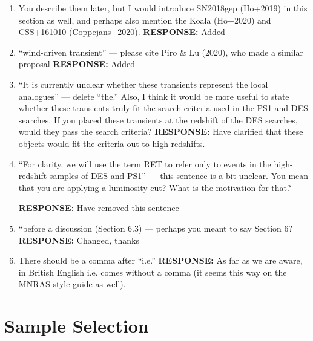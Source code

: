 \documentclass{article}
\begin{document}
\begin{enumerate}
\item You describe them later, but I would introduce SN2018gep (Ho+2019) in this section as well, and perhaps also mention the Koala (Ho+2020) and CSS+161010 (Coppejans+2020).
\vskip0.1cm
{\bf RESPONSE: } Added

\item “wind-driven transient” — please cite Piro \& Lu (2020), who made a similar proposal
\vskip0.1cm
{\bf RESPONSE: } Added

\item “It is currently unclear whether these transients represent the local analogues” — delete “the.” Also, I think it would be more useful to state whether these transients truly fit the search criteria used in the PS1 and DES searches. If you placed these transients at the redshift of the DES searches, would they pass the search criteria?
\vskip0.1cm
{\bf RESPONSE: } Have clarified that these objects would fit the criteria out to high redshifts.

\item “For clarity, we will use the term RET to refer only to events in the high-redshift samples of DES and PS1” — this sentence is a bit unclear. You mean that you are applying a luminosity cut? What is the motivation for that?

\vskip0.1cm
{\bf RESPONSE: } Have removed this sentence

\item “before a discussion (Section 6.3) — perhaps you meant to say Section 6?
\vskip0.1cm
{\bf RESPONSE: } Changed, thanks

\item There should be a comma after “i.e.”
\vskip0.1cm
{\bf RESPONSE: } As far as we are aware, in British English i.e. comes without a comma (it seems this way on the MNRAS style guide as well).

\end{enumerate}
\section*{Sample Selection}
\end{document}
